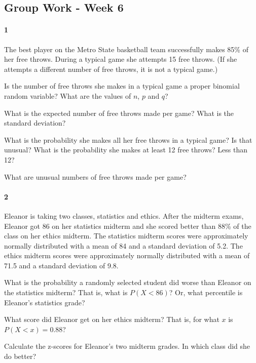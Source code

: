 \documentclass{article}
\begin{document}
\begin{flushleft}
\section*{Group Work - Week 6}
\paragraph{1} The best player on the Metro State basketball team successfully makes 85\% of her free throws. During a typical game she attempts 15 free throws. (If she attempts a different number of free throws, it is not a typical game.)
\begin{enumalpha}
\item Is the number of free throws she makes in a typical game a proper binomial random variable? What are the values of $n$, $p$ and $q$?

\vspace{1.8in}
\item What is the expected number of free throws made per game? What is the standard deviation?

\vspace{1.8in}
\item What is the probability she makes all her free throws in a typical game? Is that unusual? What is the probability she makes at least 12 free throws? Less than 12?

\vspace{1.8in}
\item What are unusual numbers of free throws made per game?
\end{enumalpha}

\newpage

\paragraph{2} Eleanor is taking two classes, statistics and ethics. After the midterm exams, Eleanor got 86 on her statistics midterm and she scored better than 88\% of the class on her ethics midterm. The statistics midterm scores were approximately normally distributed with a mean of 84 and a standard deviation of 5.2. The ethics midterm scores were approximately normally distributed with a mean of 71.5 and a standard deviation of 9.8. 

\begin{enumalpha}
\item What is the probability a randomly selected student did worse than Eleanor on the statistics midterm? That is, what is $P(X < 86)$? Or, what percentile is Eleanor's statistics grade?

\vspace{2in}
\item What score did Eleanor get on her ethics midterm? That is, for what $x$ is $P(X < x) = 0.88$? 

\vspace{2in}
\item Calculate the z-scores for Eleanor's two midterm grades. In which class did she do better?
\end{enumalpha}

\end{flushleft}
\end{document}
